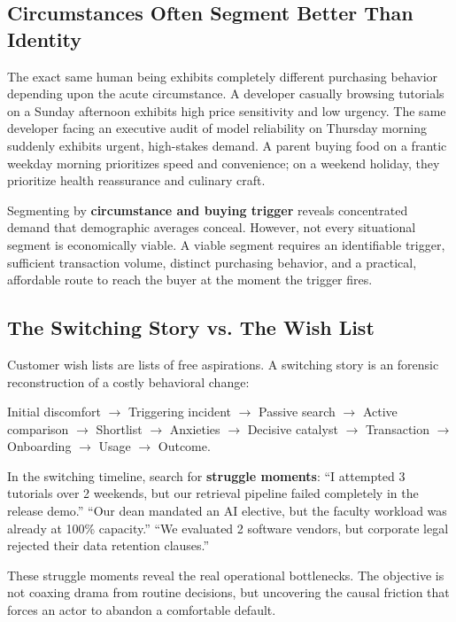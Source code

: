 \subsection{Circumstances Often Segment Better Than Identity}

The exact same human being exhibits completely different purchasing behavior depending upon the acute circumstance. A developer casually browsing tutorials on a Sunday afternoon exhibits high price sensitivity and low urgency. The same developer facing an executive audit of model reliability on Thursday morning suddenly exhibits urgent, high-stakes demand. A parent buying food on a frantic weekday morning prioritizes speed and convenience; on a weekend holiday, they prioritize health reassurance and culinary craft.

Segmenting by \textbf{circumstance and buying trigger} reveals concentrated demand that demographic averages conceal. However, not every situational segment is economically viable. A viable segment requires an identifiable trigger, sufficient transaction volume, distinct purchasing behavior, and a practical, affordable route to reach the buyer at the moment the trigger fires.

\subsection{The Switching Story vs. The Wish List}

Customer wish lists are lists of free aspirations. A switching story is an forensic reconstruction of a costly behavioral change:
\begin{center}
\small
Initial discomfort $\rightarrow$ Triggering incident $\rightarrow$ Passive search $\rightarrow$ Active comparison $\rightarrow$ Shortlist $\rightarrow$ Anxieties $\rightarrow$ Decisive catalyst $\rightarrow$ Transaction $\rightarrow$ Onboarding $\rightarrow$ Usage $\rightarrow$ Outcome.
\end{center}

In the switching timeline, search for \textbf{struggle moments}: ``I attempted 3 tutorials over 2 weekends, but our retrieval pipeline failed completely in the release demo.'' ``Our dean mandated an AI elective, but the faculty workload was already at 100\% capacity.'' ``We evaluated 2 software vendors, but corporate legal rejected their data retention clauses.''

These struggle moments reveal the real operational bottlenecks. The objective is not coaxing drama from routine decisions, but uncovering the causal friction that forces an actor to abandon a comfortable default.

